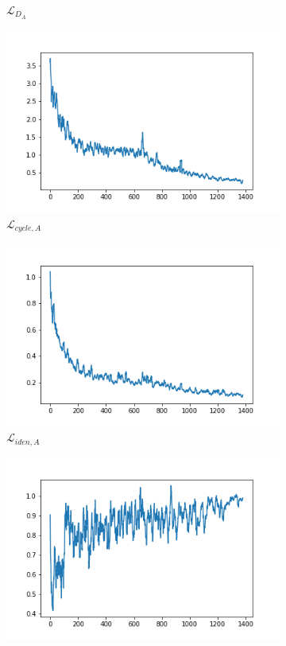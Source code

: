 \documentclass[twocolumn,11pt]{ctexart}
\begin{document}
\begin{figure}[htb]
\begin{subfigure}[b]{0.23\linewidth}
        \caption{$\mathcal{L}_{D_A}$}
      \end{subfigure}
      \begin{subfigure}[b]{0.23\linewidth}
        \includegraphics[width=\linewidth]{exp2_cycle_A.png}
        \caption{$\mathcal{L}_{cycle,A}$}
      \end{subfigure}
      \begin{subfigure}[b]{0.23\linewidth}
        \includegraphics[width=\linewidth]{exp2_idt_A.png}
        \caption{$\mathcal{L}_{iden,A}$}
      \end{subfigure}
      \begin{subfigure}[b]{0.23\linewidth}
        \includegraphics[width=\linewidth]{exp2_G_B.png}

\end{subfigure}
\end{figure}
\end{document}
